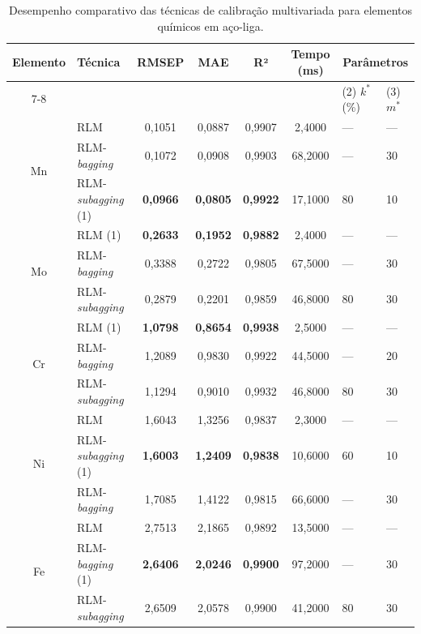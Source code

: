 \begin{table}[htbp]
\centering
\caption{Desempenho comparativo das técnicas de calibração multivariada para elementos químicos em aço-liga.}
\label{tab:baggingsubba}
\footnotesize
\begin{tabular}{clccccll} %
\toprule
\textbf{Elemento} & \textbf{Técnica} & \textbf{RMSEP} & \textbf{MAE} & \textbf{R²} & \textbf{Tempo} (ms) & \multicolumn{2}{c}{\textbf{Parâmetros}} \\ \cline{7-8}
 & & & & & & (2) $k^*$ (\%) & (3) $m^*$ \\
\midrule
\multirow{3}{*}{Mn} 
  & RLM              & 0,1051 & 0,0887 & 0,9907 &  2,4000  & --- & --- \\
  & RLM-\textit{bagging}      & 0,1072 & 0,0908 & 0,9903 & 68,2000  & --- & 30 \\
  & RLM-\textit{subagging} (1) & \textbf{0,0966} & \textbf{0,0805} & \textbf{0,9922} & 17,1000  & 80 & 10 \\
\midrule
\multirow{3}{*}{Mo} 
  & RLM (1)          & \textbf{0,2633} & \textbf{0,1952} & \textbf{0,9882} &  2,4000  & --- & --- \\
  & RLM-\textit{bagging}      & 0,3388 & 0,2722 & 0,9805 & 67,5000  & --- & 30 \\
  & RLM-\textit{subagging}    & 0,2879 & 0,2201 & 0,9859 & 46,8000  & 80 & 30 \\
\midrule
\multirow{3}{*}{Cr} 
  & RLM (1)          & \textbf{1,0798} & \textbf{0,8654} & \textbf{0,9938} &  2,5000  & --- & --- \\
  & RLM-\textit{bagging}      & 1,2089 & 0,9830 & 0,9922 & 44,5000  & --- & 20 \\
  & RLM-\textit{subagging}    & 1,1294 & 0,9010 & 0,9932 & 46,8000  & 80 & 30 \\
\midrule
\multirow{3}{*}{Ni} 
  & RLM              & 1,6043 & 1,3256 & 0,9837 &  2,3000  & --- & --- \\
  & RLM-\textit{subagging} (1) & \textbf{1,6003} & \textbf{1,2409} & \textbf{0,9838} & 10,6000  & 60 & 10 \\
  & RLM-\textit{bagging}      & 1,7085 & 1,4122 & 0,9815 & 66,6000  & --- & 30 \\
\midrule
\multirow{3}{*}{Fe} 
  & RLM              & 2,7513 & 2,1865 & 0,9892 & 13,5000  & --- & --- \\
  & RLM-\textit{bagging} (1)   & \textbf{2,6406} & \textbf{2,0246} & \textbf{0,9900} & 97,2000  & --- & 30 \\
  & RLM-\textit{subagging}    & 2,6509 & 2,0578 & 0,9900 & 41,2000  & 80 & 30 \\
\bottomrule
\end{tabular}


\end{table}
